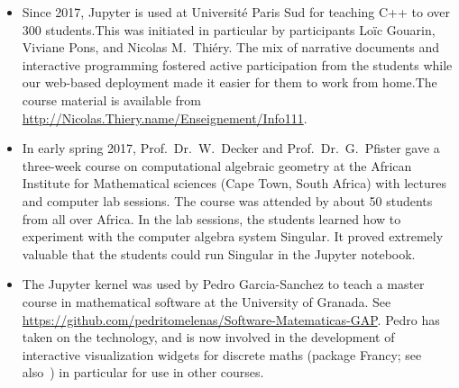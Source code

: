 \begin{Aim 1}
\begin{Aim 2}
\begin{itemize}
    5 participants installed a source version of Sage for the first time (so that they could edit the source).
    3 used git for the first time.
    5 used git within Sage for the first time.
    11 got their first Trac account .
    5 got their first contribution to a Sage ticket.
    8 are in the process of getting their first code integrated to Sage.

We worked on 14 tickets during the week, 6 of those which have been merged since the conference. All participants said they had learned new things and it would impact their careers. %

\subsection{Teaching}\label{teaching}
We showcase here a few of the many uses in teaching of the Jupyter kernels we contributed to:

     \item Since 2017, Jupyter is used at Université Paris Sud for teaching C++ to over 300 students.This was initiated in particular by
     \ODK participants Loïc Gouarin, Viviane Pons, and Nicolas M.\ Thiéry. The mix of narrative documents and interactive programming 
     fostered active participation from the students while our web-based deployment made it easier for them to work from home.The course 
     material is available from \url{http://Nicolas.Thiery.name/Enseignement/Info111}.
     
     \item In early spring 2017, Prof.~Dr.~W.~Decker and Prof.~Dr.~G.~Pfister gave a three-week course on computational algebraic geometry 
     at the African Institute for Mathematical sciences (Cape Town, South Africa) with lectures and computer lab sessions.
     The course was attended by about 50 students from all over Africa. In the lab sessions, the students learned how to experiment with the
     computer algebra system Singular. It proved extremely valuable that the students could run Singular in the Jupyter notebook.
     
     \item The \GAP Jupyter kernel was used by Pedro Garcia-Sanchez to teach a master course in mathematical software at the University of
     Granada. See  \url{https://github.com/pedritomelenas/Software-Matematicas-GAP}. Pedro has taken on the technology, and is now involved
     in the   development of interactive visualization widgets for discrete maths (package Francy; see also~) in particular for use in other courses.
     

\end{itemize}
\end{Aim 2}
\end{Aim 1}
